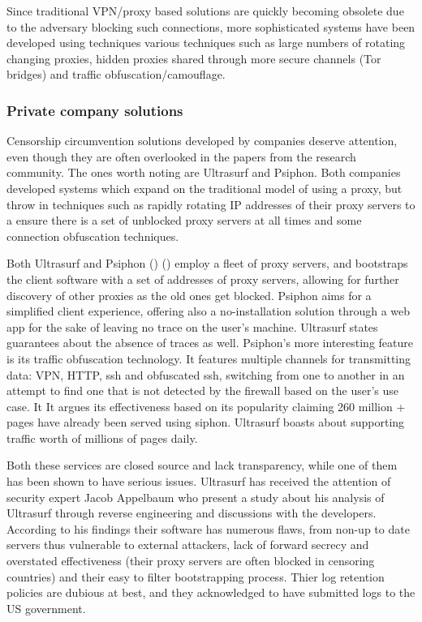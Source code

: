 \documentclass[11pt]{book} %
\begin{document}
Since traditional VPN/proxy based solutions are quickly becoming obsolete due to the adversary blocking such connections, more sophisticated systems have been developed using techniques various techniques such as large numbers of rotating changing proxies, hidden proxies shared through more secure channels (Tor bridges) and traffic obfuscation/camouflage.

\subsubsection{Private company solutions}
Censorship circumvention solutions developed by companies deserve attention, even though they are often overlooked in the papers from the research community. The ones worth noting are Ultrasurf and Psiphon. Both companies developed systems which expand on the traditional model of using a proxy, but throw in techniques such as rapidly rotating IP addresses of their proxy servers to a ensure there is a set of unblocked proxy servers at all times and some connection obfuscation techniques.

Both Ultrasurf and Psiphon (\citep*{ultrareach}) (\citep*{psiphon}) employ a fleet of proxy servers, and bootstraps the client software with a set of addresses of proxy servers, allowing for further discovery of other proxies as the old ones get blocked. Psiphon aims for a simplified client experience, offering also a no-installation solution through a web app for the sake of leaving no trace on the user’s machine. Ultrasurf states guarantees about the absence of traces as well. Psiphon’s  more interesting feature is its traffic obfuscation technology. It features multiple channels for transmitting data: VPN, HTTP, ssh and obfuscated ssh, switching from one to another in an attempt to find one that is not detected by the firewall based on the user’s use case.  It It argues its effectiveness based on its popularity claiming 260 million + pages have already been served using siphon. Ultrasurf boasts about supporting traffic worth of millions of pages daily.

Both these services are closed source and lack transparency, while one of them has been shown to have serious issues. Ultrasurf has received the attention of security expert Jacob Appelbaum who present a study \citep*{ultrasurfSucks} about his analysis of Ultrasurf through reverse engineering and discussions with the developers. According to his findings their software has numerous flaws, from non-up to date servers thus vulnerable to external attackers, lack of forward secrecy and overstated effectiveness (their proxy servers are often blocked in censoring countries) and their easy to filter bootstrapping process. Thier log retention policies are dubious at best, and they acknowledged to have submitted logs to the US government. 
\end{document}
